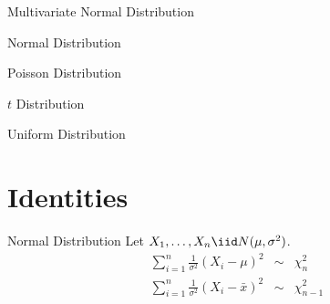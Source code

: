 \documentclass[11pt,a4paper]{article}
\begin{document}
\begin{definition}{Multivariate Normal Distribution}

\end{definition}

\begin{definition}{Normal Distribution}

\end{definition}

\begin{definition}{Poisson Distribution}

\end{definition}

\begin{definition}{$t$ Distribution}

\end{definition}

\begin{definition}{Uniform Distribution}

\end{definition}

\section{Identities}

\begin{remark}{Normal Distribution}
  Let $X_1,\dots,X_n\iid N(\mu,\sigma^2)$.
\[\begin{array}{rcl}
  \sum\limits_{i=1}^n\frac1{\sigma^2}(X_i-\mu)^2&\sim&\chi^2_n\\
  \sum\limits_{i=1}^n\frac1{\sigma^2}(X_i-\bar{x})^2&\sim&\chi^2_{n-1}
\end{array}\]
\end{remark}
\end{document}
